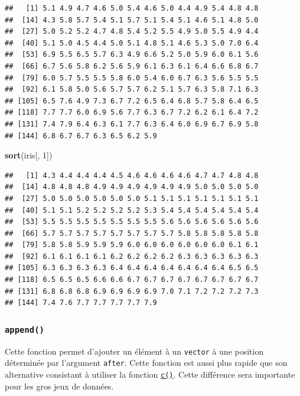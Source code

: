 \documentclass[twoside,symmetric]{book}
\newenvironment{Shaded}{}{}
\newcommand{\DecValTok}[1]{#1}
\newcommand{\KeywordTok}[1]{\textbf{#1}}
\newcommand{\NormalTok}[1]{#1}
\begin{document}
\begin{verbatim}
##   [1] 5.1 4.9 4.7 4.6 5.0 5.4 4.6 5.0 4.4 4.9 5.4 4.8 4.8
##  [14] 4.3 5.8 5.7 5.4 5.1 5.7 5.1 5.4 5.1 4.6 5.1 4.8 5.0
##  [27] 5.0 5.2 5.2 4.7 4.8 5.4 5.2 5.5 4.9 5.0 5.5 4.9 4.4
##  [40] 5.1 5.0 4.5 4.4 5.0 5.1 4.8 5.1 4.6 5.3 5.0 7.0 6.4
##  [53] 6.9 5.5 6.5 5.7 6.3 4.9 6.6 5.2 5.0 5.9 6.0 6.1 5.6
##  [66] 6.7 5.6 5.8 6.2 5.6 5.9 6.1 6.3 6.1 6.4 6.6 6.8 6.7
##  [79] 6.0 5.7 5.5 5.5 5.8 6.0 5.4 6.0 6.7 6.3 5.6 5.5 5.5
##  [92] 6.1 5.8 5.0 5.6 5.7 5.7 6.2 5.1 5.7 6.3 5.8 7.1 6.3
## [105] 6.5 7.6 4.9 7.3 6.7 7.2 6.5 6.4 6.8 5.7 5.8 6.4 6.5
## [118] 7.7 7.7 6.0 6.9 5.6 7.7 6.3 6.7 7.2 6.2 6.1 6.4 7.2
## [131] 7.4 7.9 6.4 6.3 6.1 7.7 6.3 6.4 6.0 6.9 6.7 6.9 5.8
## [144] 6.8 6.7 6.7 6.3 6.5 6.2 5.9
\end{verbatim}

\begin{Shaded}
\begin{Highlighting}[]
\KeywordTok{sort}\NormalTok{(iris[, }\DecValTok{1}\NormalTok{])}
\end{Highlighting}
\end{Shaded}

\begin{verbatim}
##   [1] 4.3 4.4 4.4 4.4 4.5 4.6 4.6 4.6 4.6 4.7 4.7 4.8 4.8
##  [14] 4.8 4.8 4.8 4.9 4.9 4.9 4.9 4.9 4.9 5.0 5.0 5.0 5.0
##  [27] 5.0 5.0 5.0 5.0 5.0 5.0 5.1 5.1 5.1 5.1 5.1 5.1 5.1
##  [40] 5.1 5.1 5.2 5.2 5.2 5.2 5.3 5.4 5.4 5.4 5.4 5.4 5.4
##  [53] 5.5 5.5 5.5 5.5 5.5 5.5 5.5 5.6 5.6 5.6 5.6 5.6 5.6
##  [66] 5.7 5.7 5.7 5.7 5.7 5.7 5.7 5.7 5.8 5.8 5.8 5.8 5.8
##  [79] 5.8 5.8 5.9 5.9 5.9 6.0 6.0 6.0 6.0 6.0 6.0 6.1 6.1
##  [92] 6.1 6.1 6.1 6.1 6.2 6.2 6.2 6.2 6.3 6.3 6.3 6.3 6.3
## [105] 6.3 6.3 6.3 6.3 6.4 6.4 6.4 6.4 6.4 6.4 6.4 6.5 6.5
## [118] 6.5 6.5 6.5 6.6 6.6 6.7 6.7 6.7 6.7 6.7 6.7 6.7 6.7
## [131] 6.8 6.8 6.8 6.9 6.9 6.9 6.9 7.0 7.1 7.2 7.2 7.2 7.3
## [144] 7.4 7.6 7.7 7.7 7.7 7.7 7.9
\end{verbatim}

\hypertarget{l015append}{%
\subsubsection{\texorpdfstring{\texttt{append()}}{append()}}\label{l015append}}

Cette fonction permet d'ajouter un élément à un \texttt{vector} à une position déterminée par l'argument \texttt{after}. Cette fonction est aussi plus rapide que son alternative consistant à utiliser la fonction \protect\hyperlink{l014vector}{\texttt{c()}}. Cette différence sera importante pour les gros jeux de données.
\end{document}
